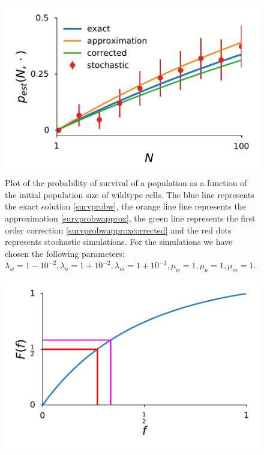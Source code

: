 \documentclass[11pt,a4paper]{article}
\begin{document}
\begin{figure}[!t]
 \vspace*{1\baselineskip}
\includegraphics[width=1\textwidth]{SurvPlotNData.pdf}
\caption{Plot of the probability of survival of a population as a function of the initial population size of wildtype cells. The blue line represents the exact solution \eqref{survprobw}, the orange line line represents the approximation \eqref{survprobwapprox}, the green line represents the first order correction \eqref{survprobwapproxcorrected} and the red dots represents stochastic simulations. For the simulations we have chosen the following parameters: $\lambda_w=1-10^{-2}, \lambda_a=1+10^{-2},\lambda_m=1+10^{-1},\mu_w=1,\mu_a=1,\mu_m=1.$}
\label{SurvPlotNData}
\end{figure}

\begin{figure}[!t]
 \vspace*{1\baselineskip}
\includegraphics[width=1\textwidth]{FractionPlot.pdf}
\caption{}
\label{FractionPlot}
\end{figure}
\end{document}
